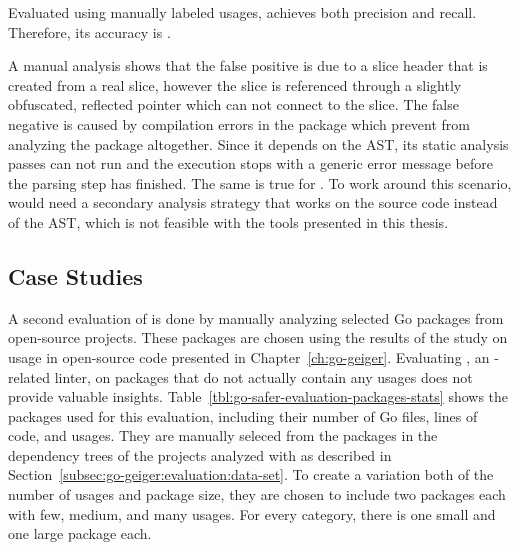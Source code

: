 \begin{hero}
    Evaluated using manually labeled \unsafe{} usages, \toolSafer{} achieves both  precision and
    recall.
    Therefore, its accuracy is .
\end{hero}

A manual analysis shows that the  false positive is due to a slice header that is created from a real
slice, however the slice is referenced through a slightly obfuscated, reflected pointer which \toolSafer{} can not
connect to the slice.
The false negative is caused by compilation errors in the package which prevent \toolSafer{} from analyzing the package
altogether.
Since it depends on the \acrshort{AST}, its static analysis passes can not run and the execution stops with a generic
error message before the parsing step has finished.
The same is true for \toolGosec{}.
To work around this scenario, \toolSafer{} would need a secondary analysis strategy that works on the source code
instead of the \acrshort{AST}, which is not feasible with the tools presented in this thesis.



\subsection{Case Studies}\label{subsec:go-safer:evaluation:case-studies}

A second evaluation of \toolSafer{} is done by manually analyzing  selected Go packages from open-source
projects.
These packages are chosen using the results of the study on \unsafe{} usage in open-source code presented in
Chapter~\ref{ch:go-geiger}.
Evaluating \toolSafer{}, an \unsafe{}-related linter, on packages that do not actually contain any \unsafe{} usages does
not provide valuable insights.
Table~\ref{tbl:go-safer-evaluation-packages-stats} shows the  packages used for this evaluation, including
their number of Go files, lines of code, and \unsafe{} usages.
They are manually seleced from the packages in the dependency trees of the projects analyzed with \toolGeiger{} as
described in Section~\ref{subsec:go-geiger:evaluation:data-set}.
To create a variation both of the number of \unsafe{} usages and package size, they are chosen to include two packages
each with few, medium, and many \unsafe{} usages.
For every category, there is one small and one large package each.

